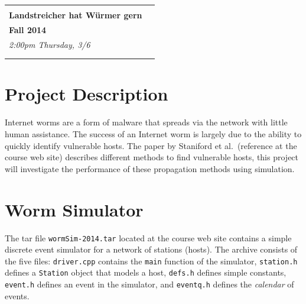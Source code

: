 \documentclass[10pt]{article}
\begin{document}
\newcommand{\beq}{\begin{eqnarray}}
\newcommand{\eeq}{\end{eqnarray}}

{
 \setlength{\tabcolsep}{0in}
 \noindent
 \begin{tabular*}{\textwidth}{p{4.75in}r}
 \begin{tabular}{l}
 \Large \textbf{CSC 790 A: Project 2} \\
 \Large \textbf{Landstreicher hat W\"{u}rmer gern} \\ \hline %
 \normalsize \textbf{Fall 2014}
 \end{tabular}
 &
  {\renewcommand{\arraystretch}{1.25}
  \setlength{\tabcolsep}{0.1in}
  \begin{tabular}{|l|} \hline
    \textbf{\textsf{Due}} \\ \hline \hline
    \textit{\textsf{2:00pm Thursday, 3/6}} \\ \hline
  \end{tabular}} \\ \\ \hline \hline
\end{tabular*}
}

\section*{Project Description}

\thispagestyle{fancy}

Internet worms are a form of malware that spreads via the network
with little human assistance. The success of an Internet worm is
largely due to the ability to quickly identify vulnerable hosts.
The paper by Staniford et al.\ (reference at the course web site)
describes different methods to find vulnerable hosts, this project
will investigate the performance of these propagation methods
using simulation.


\section*{Worm Simulator}

The tar file \texttt{wormSim-2014.tar} located at the course web site
contains a simple discrete event simulator for a network of
stations (hosts). The archive consists of the five files:
\texttt{driver.cpp} contains the \texttt{main} function of the
simulator, \texttt{station.h} defines a \texttt{Station} object
that models a host, \texttt{defs.h} defines simple constants,
\texttt{event.h} defines an event in the simulator, and
\texttt{eventq.h} defines the \textit{calendar} of events.
\end{document}
